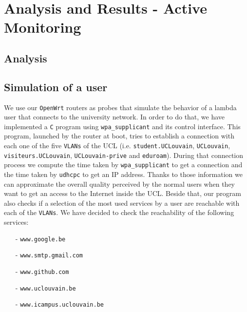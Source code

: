 
\chapter{Analysis and Results - Active Monitoring} %

\label{Chapter6} %




\section{Analysis}



\section{Simulation of a user}
We use our \texttt{OpenWrt} routers as probes that simulate the behavior of a lambda user that connects to the university network. In order to do that, we have implemented a \texttt{C} program using \texttt{wpa\_supplicant} and its control interface. This program, launched by the router at boot, tries to establish a connection with each one of the five \texttt{VLANs} of the UCL (i.e. \texttt{student.UCLouvain}, \texttt{UCLouvain}, \texttt{visiteurs.UCLouvain}, \texttt{UCLouvain-prive} and \texttt{eduroam}). During that connection process we compute the time taken by \texttt{wpa\_supplicant} to get a connection and the time taken by \texttt{udhcpc} to get an IP address. Thanks to those information we can approximate the overall quality perceived by the normal users when they want to get an access to the Internet inside the UCL. Beside that, our program also checks if a selection of the most used services by a user are reachable with each of the \texttt{VLANs}. We have decided to check the reachability of the following services:
\begin{itemize}
	\item[-] \texttt{www.google.be}
	\item[-] \texttt{www.smtp.gmail.com}
	\item[-] \texttt{www.github.com}
	\item[-] \texttt{www.uclouvain.be}
	\item[-] \texttt{www.icampus.uclouvain.be}
\end{itemize}

